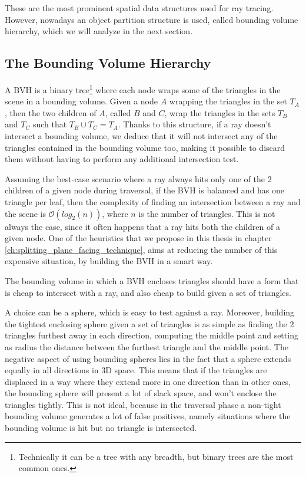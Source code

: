 \documentclass{PoliMi_MasterThesis}
\begin{document}
These are the most prominent spatial data structures used for ray tracing. However, nowadays an object partition structure is used, called bounding volume hierarchy, which we will analyze in the next section.

\subsection{The Bounding Volume Hierarchy} \label{ssec:the_bounding_volume_hierarchy}
A BVH \cite{bvh_primer} is a binary tree\footnote{Technically it can be a tree with any breadth, but binary trees are the most common ones.} where each node wraps some of the triangles in the scene in a bounding volume. Given a node $A$ wrapping the triangles in the set $T_A$, then the two children of $A$, called $B$ and $C$, wrap the triangles in the sets $T_B$ and $T_C$ such that $T_B \cup T_C = T_A$. Thanks to this structure, if a ray doesn't intersect a bounding volume, we deduce that it will not intersect any of the triangles contained in the bounding volume too, making it possible to discard them without having to perform any additional intersection test.

Assuming the best-case scenario where a ray always hits only one of the 2 children of a given node during traversal, if the BVH is balanced and has one triangle per leaf, then the complexity of finding an intersection between a ray and the scene is $\mathcal{O}(log_2(n))$, where $n$ is the number of triangles. This is not always the case, since it often happens that a ray hits both the children of a given node. One of the heuristics that we propose in this thesis in chapter \ref{ch:splitting_plane_facing_technique}, aims at reducing the number of this expensive situation, by building the BVH in a smart way.

The bounding volume in which a BVH encloses triangles should have a form that is cheap to intersect with a ray, and also cheap to build given a set of triangles.

A choice can be a sphere, which is easy to test against a ray. Moreover, building the tightest enclosing sphere given a set of triangles is as simple as finding the 2 triangles furthest away in each direction, computing the middle point and setting as radius the distance between the furthest triangle and the middle point. The negative aspect of using bounding spheres lies in the fact that a sphere extends equally in all directions in 3D space. This means that if the triangles are displaced in a way where they extend more in one direction than in other ones, the bounding sphere will present a lot of slack space, and won't enclose the triangles tightly. This is not ideal, because in the traversal phase a non-tight bounding volume generates a lot of false positives, namely situations where the bounding volume is hit but no triangle is intersected.
\end{document}
